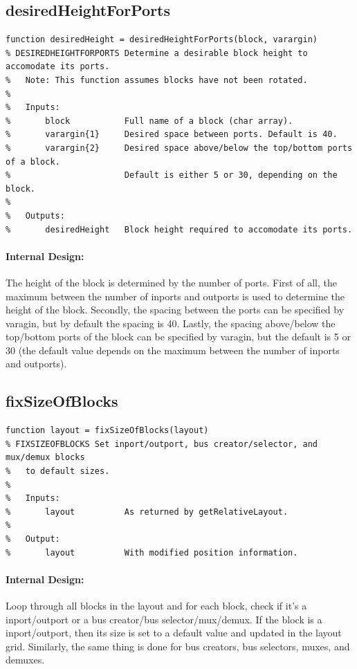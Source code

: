 \documentclass[12pt,letterpaper]{report}
\begin{document}
\subsection{desiredHeightForPorts} \label{desiredHeightForPorts}
\begin{lstlisting}
function desiredHeight = desiredHeightForPorts(block, varargin)
% DESIREDHEIGHTFORPORTS Determine a desirable block height to accomodate its ports.
%   Note: This function assumes blocks have not been rotated.
%
%   Inputs:
%       block           Full name of a block (char array).
%       varargin{1}     Desired space between ports. Default is 40.
%       varargin{2}     Desired space above/below the top/bottom ports of a block.
%                       Default is either 5 or 30, depending on the block.
%
%   Outputs:
%       desiredHeight   Block height required to accomodate its ports.
\end{lstlisting}
\paragraph{Internal Design:} The height of the block is determined by the number of ports. First of all, the maximum between the number of inports and outports is used to determine the height of the block. Secondly, the spacing between the ports can be specified by varagin, but by default the spacing is 40. Lastly, the spacing above/below the top/bottom ports of the block can be specified by varagin, but the default is 5 or 30 (the default value depends on the maximum between the number of inports and outports).

\subsection{fixSizeOfBlocks}
\begin{lstlisting}
function layout = fixSizeOfBlocks(layout)
% FIXSIZEOFBLOCKS Set inport/outport, bus creator/selector, and mux/demux blocks
%   to default sizes.
%
%   Inputs:
%       layout          As returned by getRelativeLayout.
%
%   Output:
%       layout          With modified position information.
\end{lstlisting}
\paragraph{Internal Design:} Loop through all blocks in the layout and for each block, check if it's a inport/outport or a bus creator/bus selector/mux/demux. If the block is a inport/outport, then its size is set to a default value and updated in the layout grid. Similarly, the same thing is done for bus creators, bus selectors, muxes, and demuxes.
\end{document}
